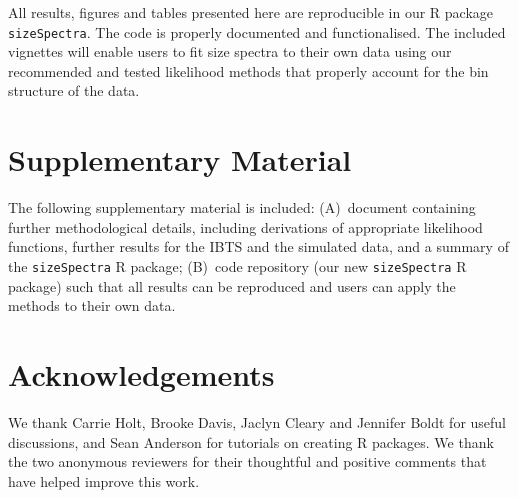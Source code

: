 All results, figures and tables presented here are reproducible in our R package
{\tt sizeSpectra}. The code is properly documented and functionalised. The included
vignettes will enable users to fit size spectra to their own data using our recommended
and tested likelihood methods that properly account for the bin structure of the data.

\section*{Supplementary Material}

The following supplementary material is included:
(A)~document containing further methodological details, including derivations
of appropriate likelihood functions, further results for the IBTS and
the simulated data, and a summary of the {\tt sizeSpectra} R package;
(B)~code repository (our new {\tt sizeSpectra} R package) such that all results can be reproduced and users
can apply the methods to their own data.

\section*{Acknowledgements}

We thank Carrie Holt, Brooke Davis, Jaclyn Cleary and Jennifer Boldt for useful
discussions, and Sean Anderson for tutorials on creating R packages. We thank
the two anonymous reviewers for their thoughtful and positive comments that have
helped improve this work.



